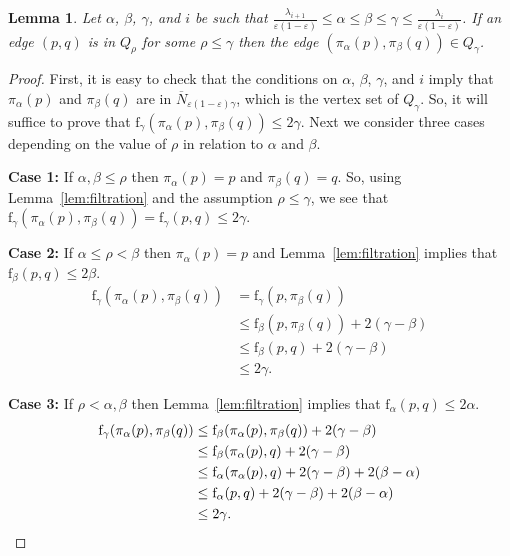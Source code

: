 \documentclass[a4paper]{article}
\newtheorem{lemma}[theorem]{Lemma}
\newcommand{\e}{\varepsilon}
\newcommand{\ir}{\lambda}
\newcommand{\net}{N}
\newcommand{\cl}[1]{\overline{#1}}
\newcommand{\ff}{\mathrm{f}}
\newcommand{\proj}{\pi}
\begin{document}
  \begin{lemma}\label{lem:proj_and_Q_for_one_edge}
    Let $\alpha$, $\beta$, $\gamma$, and $i$ be such that $\frac{\ir_{i+1}}{\e(1-\e)}\le \alpha \le \beta \le \gamma \le \frac{\ir_i}{\e(1-\e)}$.
    If an edge $(p,q)$ is in $Q_\rho$ for some $\rho\le \gamma$ then the edge $(\proj_\alpha(p), \proj_\beta(q)) \in Q_\gamma$.
  \end{lemma}
  \begin{proof}
    First, it is easy to check that the conditions on $\alpha$, $\beta$, $\gamma$, and $i$ imply that $\proj_\alpha(p)$ and $\proj_\beta(q) $ are in $\cl\net_{\e(1-\e)\gamma}$, which is the vertex set of $Q_\gamma$.
    So, it will suffice to prove that $\ff_\gamma(\proj_\alpha(p), \proj_\beta(q))\le 2\gamma$.
    Next we consider three cases depending on the value of $\rho$ in relation to $\alpha$ and $\beta$.
  
    \noindent\textbf{Case 1:} If $\alpha,\beta\le \rho$ then $\proj_\alpha(p) = p$ and $\proj_\beta(q) = q$.
    So, using Lemma~\ref{lem:filtration} and the assumption $\rho\le \gamma$, we see that $\ff_\gamma(\proj_\alpha(p), \proj_\beta(q)) = \ff_\gamma(p,q) \le 2\gamma$.
  
    \noindent\textbf{Case 2:} If $\alpha\le \rho < \beta$ then $\proj_\alpha(p) = p$ and Lemma~\ref{lem:filtration} implies that $\ff_\beta(p,q)\le 2\beta$.
    \begin{align*}
      \ff_\gamma(\proj_\alpha(p), \proj_\beta(q))
        &= \ff_\gamma(p, \proj_\beta(q)) \\ &\le \ff_\beta(p, \proj_\beta(q)) + 2(\gamma-\beta)\\ &\le \ff_\beta(p, q) + 2(\gamma-\beta)\\ &\le 2\gamma. \end{align*}
  
    \noindent\textbf{Case 3:} If $\rho < \alpha, \beta$ then Lemma~\ref{lem:filtration} implies that $\ff_\alpha(p,q)\le 2\alpha$.
    \begin{align*}
      \ff_\gamma(\proj_\alpha(p), \proj_\beta(q))
        &\le \ff_\beta(\proj_\alpha(p), \proj_\beta(q)) + 2(\gamma-\beta)\\ &\le \ff_\beta(\proj_\alpha(p), q) + 2(\gamma-\beta)\\ &\le \ff_\alpha(\proj_\alpha(p), q) + 2(\gamma-\beta) + 2(\beta-\alpha)\\ &\le \ff_\alpha(p, q) + 2(\gamma-\beta) + 2(\beta-\alpha)\\ &\le 2\gamma. \qedhere \end{align*}
  \end{proof}
\end{document}
